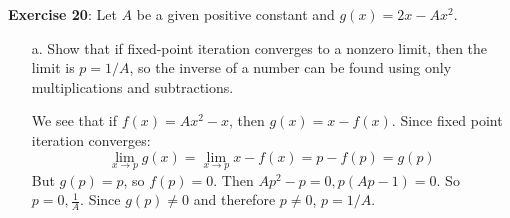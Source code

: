 \documentclass{article}
\begin{document}
\textbf{Exercise 20}: Let $A$ be a given positive constant and $g(x) = 2x - Ax^{2}$.
    \begin{itemize}
        \item [a.] Show that if fixed-point iteration converges to a nonzero limit, then the limit is $p = 1 / A$, so the inverse of a number can be found using only multiplications and subtractions.
            \begin{answer}
                We see that if $f(x) = Ax^{2} - x$, then $g(x) = x - f(x)$. Since fixed point iteration converges:
                    \begin{equation*}
                        \lim\limits_{x \to p} g(x) = \lim\limits_{x \to p}x - f(x) = p - f(p) = g(p)
                    \end{equation*}
                But $g(p) = p$, so $f(p) = 0$. Then $Ap^{2} - p = 0, p(Ap - 1) = 0$. So $p = 0, \frac{1}{A}$. Since $g(p) \neq 0$ and therefore $p \neq 0$, $p = 1/A$.
            \end{answer}


\end{itemize}
\end{document}
